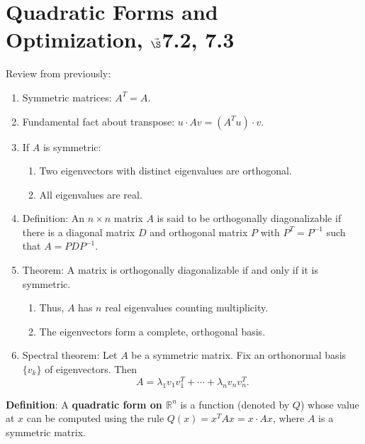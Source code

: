 
%

\section{{Quadratic Forms and Optimization, $\vec\S$7.2, 7.3}}


%
\thispagestyle{fancy}

Review from previously:

\begin{enumerate}
    \item Symmetric matrices: $A^T = A$.
    \item Fundamental fact about transpose: $u \cdot Av = (A^T u) \cdot v$.
    \item If $A$ is symmetric:
    \begin{enumerate}
        \item Two eigenvectors with distinct eigenvalues are orthogonal.
        \item All eigenvalues are real.
    \end{enumerate}
    \item Definition: An $n \times n$ matrix $A$ is said to be orthogonally diagonalizable if there is a diagonal matrix $D$ and orthogonal matrix $P$ with $P^T = P^{-1}$ such that $A = PDP^{-1}$.
    \item Theorem: A matrix is orthogonally diagonalizable if and only if it is symmetric.
    \begin{enumerate}
        \item Thus, $A$ has $n$ real eigenvalues counting multiplicity.
        \item The eigenvectors form a complete, orthogonal basis.
    \end{enumerate}
    \item Spectral theorem: Let $A$ be a symmetric matrix. Fix an orthonormal basis $\{v_k\}$ of eigenvectors. Then
    \[
    A = \lambda_1 v_1v_1^T + \cdots + \lambda_n v_nv_n^T.
    \]
\end{enumerate}

\textbf{Definition}:
A \textbf{quadratic form on $\mathbb{R}^n$} is a function (denoted by $Q$) whose value at $x$ can be computed using the rule $Q(x) = x^T A x = x \cdot A x$, where $A$ is a symmetric matrix.

